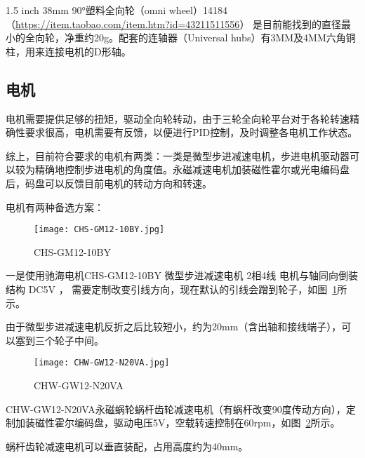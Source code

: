 1.5 inch 38mm 90°塑料全向轮（omni wheel）14184 （\url{https://item.taobao.com/item.htm?id=43211511556}） 是目前能找到的直径最小的全向轮，净重约20g。配套的连轴器（Universal hubs）有3MM及4MM六角铜柱，用来连接电机的D形轴。

\subsection{电机}

电机需要提供足够的扭矩，驱动全向轮转动，由于三轮全向轮平台对于各轮转速精确性要求很高，电机需要有反馈，以便进行PID控制，及时调整各电机工作状态。

综上，目前符合要求的电机有两类：一类是微型步进减速电机，步进电机驱动器可以较为精确地控制步进电机的角度值。永磁减速电机加装磁性霍尔或光电编码盘后，码盘可以反馈目前电机的转动方向和转速。

电机有两种备选方案：

\begin{figure}[htbp]
    \centering
    \texttt{[image: CHS-GM12-10BY.jpg]}
    \caption{CHS-GM12-10BY}
    \label{fig:CHS-GM12-10BY}
\end{figure}

一是使用驰海电机CHS-GM12-10BY 微型步进减速电机 2相4线 电机与轴同向倒装结构 DC5V ， 需要定制改变引线方向，现在默认的引线会蹭到轮子，如图~\ref{fig:CHS-GM12-10BY}所示。

由于微型步进减速电机反折之后比较短小，约为20mm（含出轴和接线端子），可以塞到三个轮子中间。

\begin{figure}[htbp]
    \centering
    \texttt{[image: CHW-GW12-N20VA.jpg]}
    \caption{CHW-GW12-N20VA}
    \label{fig:CHW-GW12-N20VA}
\end{figure}

CHW-GW12-N20VA永磁蜗轮蜗杆齿轮减速电机（有蜗杆改变90度传动方向），定制加装磁性霍尔编码盘，驱动电压5V，空载转速控制在60rpm，如图~\ref{fig:CHW-GW12-N20VA}所示。

蜗杆齿轮减速电机可以垂直装配，占用高度约为40mm。